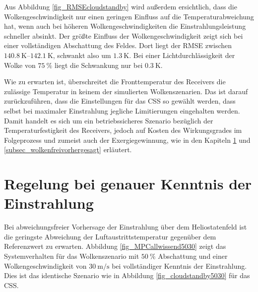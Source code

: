 Aus Abbildung \ref{fig_RMSEcloudstandby} wird außerdem ersichtlich, dass die Wolkengeschwindigkeit nur einen geringen Einfluss auf die Temperaturabweichung hat, wenn auch bei höheren Wolkengeschwindigkeiten die Einstrahlungsleistung schneller absinkt.
Der größte Einfluss der Wolkengeschwindigkeit zeigt sich bei einer vollständigen Abschattung des Feldes.
Dort liegt der RMSE zwischen $\SIrange{140.8}{142.1}{\kelvin}$, schwankt also um $\SI{1.3}{\kelvin}$.
Bei einer Lichtdurchlässigkeit der Wolke von $\SI{75}{\percent}$ liegt die Schwankung nur bei $\SI{0.3}{\kelvin}$.

Wie zu erwarten ist, überschreitet die Fronttemperatur des Receivers die zulässige Temperatur in keinem der simulierten Wolkenszenarien.
Das ist darauf zurückzuführen, dass die Einstellungen für das CSS so gewählt werden, dass selbst bei maximaler Einstrahlung jegliche Limitierungen eingehalten werden.
Damit handelt es sich um ein betriebssicheres Szenario bezüglich der Temperaturfestigkeit des Receivers, jedoch auf Kosten des Wirkungsgrades im Folgeprozess und zumeist auch der Exergiegewinnung, wie in den Kapiteln \ref{sec_AllwissendeMPC} und \ref{subsec_wolkenfreivorhergesagt} erläutert.


\section{Regelung bei genauer Kenntnis der Einstrahlung} \label{sec_AllwissendeMPC}
Bei abweichungsfreier Vorhersage der Einstrahlung über dem Heliostatenfeld ist die geringste Abweichung der Luftaustrittstemperatur gegenüber dem Referenzwert zu erwarten.
Abbildung \ref{fig_MPCallwissend5030} zeigt das Systemverhalten für das Wolkenszenario mit $\SI{50}{\percent}$ Abschattung und einer Wolkengeschwindigkeit von $\SI{30}{\metre\per\second}$ bei vollständiger Kenntnis der Einstrahlung.
Dies ist das identische Szenario wie in Abbildung \ref{fig_cloudstandby5030} für das CSS.

